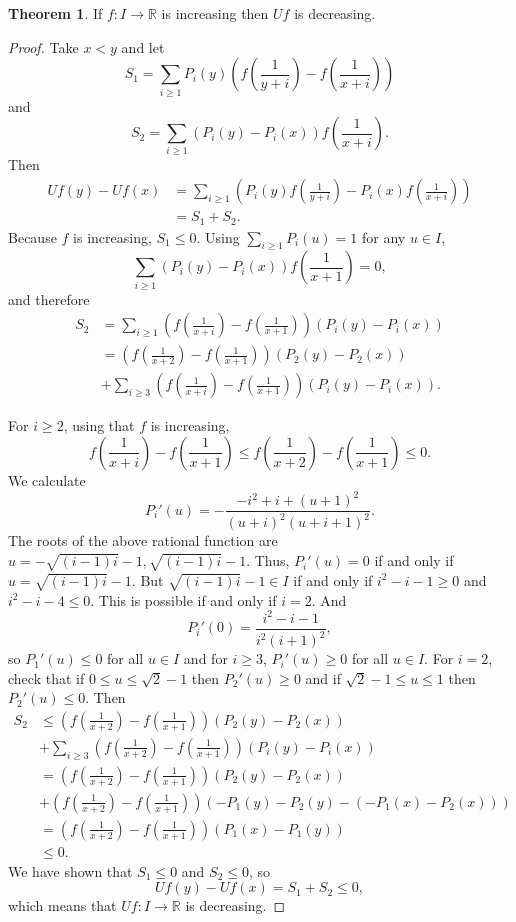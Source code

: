 \documentclass{article}
\theoremstyle{definition}
\newtheorem{theorem}{Theorem}
\theoremstyle{definition}
\begin{document}
\begin{theorem}
If $f:I \to \mathbb{R}$ is increasing then $Uf$ is decreasing.
\end{theorem}
\begin{proof}
Take $x<y$ and let
\[
S_1 = \sum_{i \geq 1} P_i(y) \left( f\left( \frac{1}{y+i}\right)-f\left(\frac{1}{x+i}\right)\right)
\]
and 
\[
S_2 = \sum_{i \geq 1} (P_i(y)-P_i(x)) f\left(\frac{1}{x+i}\right).
\]
Then
\begin{align*}
Uf(y)-Uf(x) &= \sum_{i \geq 1} \left( P_i(y) f \left(\frac{1}{y+i}\right) - P_i(x) f\left(\frac{1}{x+i}\right)\right)\\
&=S_1+S_2.
\end{align*}
Because $f$ is increasing, $S_1 \leq 0$. 
Using $\sum_{i \geq 1} P_i(u) = 1$ for any $u \in I$, 
\[
\sum_{i \geq 1}(P_i(y)-P_i(x)) f \left(\frac{1}{x+1}\right)  
=0,
\]
and therefore
\begin{align*}
S_2 &= \sum_{i \geq 1} \left(f \left(\frac{1}{x+i} \right) - f \left(\frac{1}{x+1}\right)  \right)(P_i(y)-P_i(x))\\
&=  \left(f \left(\frac{1}{x+2} \right) - f \left(\frac{1}{x+1}\right)  \right)(P_2(y)-P_2(x))\\
&+\sum_{i \geq 3} \left(f \left(\frac{1}{x+i} \right) - f \left(\frac{1}{x+1}\right)  \right)(P_i(y)-P_i(x)).
\end{align*}


For $i \geq 2$, using that $f$ is increasing,
\[
f \left(\frac{1}{x+i} \right) - f \left(\frac{1}{x+1}\right)  \leq  f \left(\frac{1}{x+2} \right) -  f \left(\frac{1}{x+1}\right) \leq 0.
\]
We calculate
\[
P_i'(u) = - \frac{-i^2+i+(u+1)^2}{(u+i)^2(u+i+1)^2}.
\]
The roots of the above rational function are $u=-\sqrt{(i-1)i}-1,\sqrt{(i-1)i}-1$. Thus, $P_i'(u)=0$ if and only if
$u=\sqrt{(i-1)i}-1$. But $\sqrt{(i-1)i}-1 \in I$ if and only if  $i^2-i-1 \geq 0$ and $i^2-i-4 \leq 0$. This is possible if and only
if $i=2$. And
\[
P_i'(0) = \frac{i^2-i-1}{i^2(i+1)^2},
\]
so $P_1'(u) \leq 0$ for all $u \in I$ and for $i \geq 3$, $P_i'(u) \geq 0$ for all $u \in I$. 
For $i=2$, check that if $0 \leq u \leq \sqrt{2}-1$ then
$P_2'(u) \geq 0$ and if $\sqrt{2}-1 \leq u \leq 1$ then $P_2'(u) \leq 0$. 
Then
\begin{align*}
S_2&\leq  \left(f \left(\frac{1}{x+2} \right) - f \left(\frac{1}{x+1}\right)  \right)(P_2(y)-P_2(x))\\
&+\sum_{i \geq 3} \left(f \left(\frac{1}{x+2} \right) - f \left(\frac{1}{x+1}\right)  \right)(P_i(y)-P_i(x))\\
&= \left(f \left(\frac{1}{x+2} \right) - f \left(\frac{1}{x+1}\right)  \right)(P_2(y)-P_2(x))\\
&+\left(f \left(\frac{1}{x+2} \right) - f \left(\frac{1}{x+1}\right)  \right)(-P_1(y)-P_2(y) - (-P_1(x)-P_2(x)))\\
&= \left(f \left(\frac{1}{x+2} \right) - f \left(\frac{1}{x+1}\right)\right)(P_1(x)-P_1(y))\\
&\leq 0.
\end{align*}
We have shown that $S_1 \leq 0$ and $S_2 \leq 0$, so
\[
Uf(y)-Uf(x) = S_1+S_2 \leq 0,
\]
which means that $Uf:I \to \mathbb{R}$ is decreasing.
\end{proof}
\end{document}
